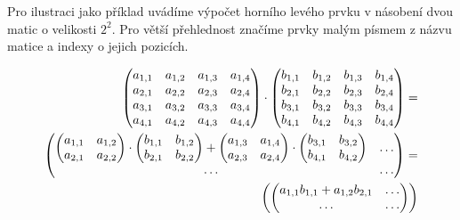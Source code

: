 Pro ilustraci jako příklad uvádíme výpočet horního levého prvku v násobení dvou matic o velikosti $ 2^{2} $. Pro větší přehlednost značíme prvky malým písmem z názvu matice a indexy o jejich pozicích.

\begin{align}
\begin{pmatrix}
a_{1,1} & a_{1,2} & a_{1,3} & a_{1,4} \\
a_{2,1} & a_{2,2} & a_{2,3} & a_{2,4} \\
a_{3,1} & a_{3,2} & a_{3,3} & a_{3,4} \\
a_{4,1} & a_{4,2} & a_{4,3} & a_{4,4}
\end{pmatrix} \cdot \begin{pmatrix}
b_{1,1} & b_{1,2} & b_{1,3} & b_{1,4} \\
b_{2,1} & b_{2,2} & b_{2,3} & b_{2,4} \\
b_{3,1} & b_{3,2} & b_{3,3} & b_{3,4} \\
b_{4,1} & b_{4,2} & b_{4,3} & b_{4,4}
\end{pmatrix} = \notag\\
\begin{pmatrix}
\begin{pmatrix}
 a_{1,1} & a_{1,2} \\
 a_{2,1} & a_{2,2} \\
\end{pmatrix} \cdot
\begin{pmatrix}
 b_{1,1} & b_{1,2} \\
 b_{2,1} & b_{2,2} \\
\end{pmatrix} + 
\begin{pmatrix}
 a_{1,3} & a_{1,4} \\
 a_{2,3} & a_{2,4} \\
\end{pmatrix} \cdot 
\begin{pmatrix}
 b_{3,1} & b_{3,2} \\
 b_{4,1} & b_{4,2} \\
\end{pmatrix} &
\hdots \\
\hdots & \hdots
\end{pmatrix} = \notag\\
\begin{pmatrix}
\begin{pmatrix}
 a_{1,1} b_{1,1}+a_{1,2} b_{2,1} & \hdots \\
 \hdots & \hdots

\end{pmatrix}
\end{pmatrix}
\end{align}
